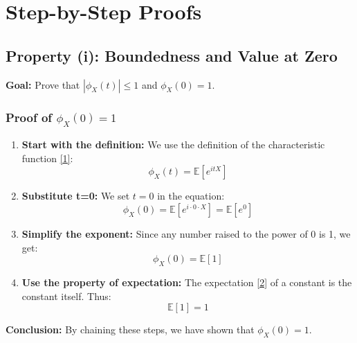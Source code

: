 \documentclass[11pt,a4paper]{article}
\begin{document}
\section{Step-by-Step Proofs}

\subsection{Property (i): Boundedness and Value at Zero}
\textbf{Goal:} Prove that $|\phi_X(t)| \leq 1$ and $\phi_X(0) = 1$.

\subsubsection{Proof of $\phi_X(0) = 1$}
\begin{enumerate}
    \item \textbf{Start with the definition:} We use the definition of the characteristic function \hyperlink{note1}{[1]}:
    \[ \phi_X(t) = \mathbb{E}[e^{itX}] \]
    \item \textbf{Substitute t=0:} We set $t=0$ in the equation:
    \[ \phi_X(0) = \mathbb{E}[e^{i \cdot 0 \cdot X}] = \mathbb{E}[e^0] \]
    \item \textbf{Simplify the exponent:} Since any number raised to the power of 0 is 1, we get:
    \[ \phi_X(0) = \mathbb{E}[1] \]
    \item \textbf{Use the property of expectation:} The expectation \hyperlink{note2}{[2]} of a constant is the constant itself. Thus:
    \[ \mathbb{E}[1] = 1 \]
\end{enumerate}
\textbf{Conclusion:} By chaining these steps, we have shown that $\phi_X(0) = 1$.
\end{document}
